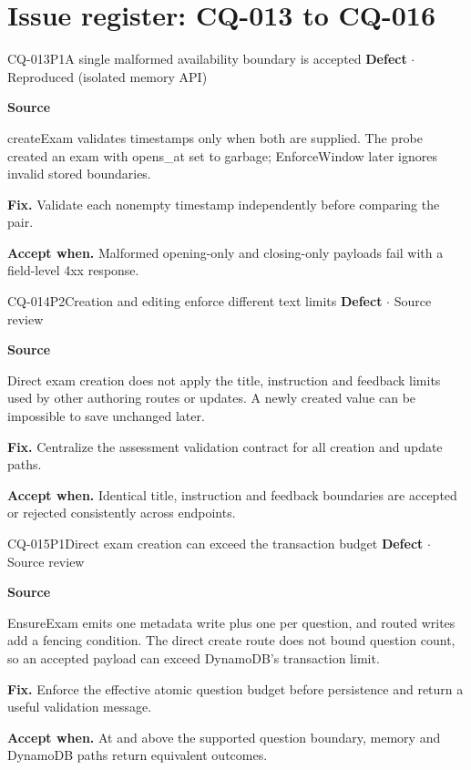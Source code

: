 \section*{Issue register: CQ-013 to CQ-016}
\begin{finding}{CQ-013}{P1}{A single malformed availability boundary is accepted}
\textbf{Defect} $\cdot$ Reproduced (isolated memory API)\par
\textbf{Source}\quad{}\par
createExam validates timestamps only when both are supplied. The probe created an exam with opens\_at set to garbage; EnforceWindow later ignores invalid stored boundaries.\par
\textbf{Fix.} Validate each nonempty timestamp independently before comparing the pair.\par
\textbf{Accept when.} Malformed opening-only and closing-only payloads fail with a field-level 4xx response.
\end{finding}
\begin{finding}{CQ-014}{P2}{Creation and editing enforce different text limits}
\textbf{Defect} $\cdot$ Source review\par
\textbf{Source}\quad{}\par
Direct exam creation does not apply the title, instruction and feedback limits used by other authoring routes or updates. A newly created value can be impossible to save unchanged later.\par
\textbf{Fix.} Centralize the assessment validation contract for all creation and update paths.\par
\textbf{Accept when.} Identical title, instruction and feedback boundaries are accepted or rejected consistently across endpoints.
\end{finding}
\begin{finding}{CQ-015}{P1}{Direct exam creation can exceed the transaction budget}
\textbf{Defect} $\cdot$ Source review\par
\textbf{Source}\quad{}\par
EnsureExam emits one metadata write plus one per question, and routed writes add a fencing condition. The direct create route does not bound question count, so an accepted payload can exceed DynamoDB's transaction limit.\par
\textbf{Fix.} Enforce the effective atomic question budget before persistence and return a useful validation message.\par
\textbf{Accept when.} At and above the supported question boundary, memory and DynamoDB paths return equivalent outcomes.
\end{finding}

